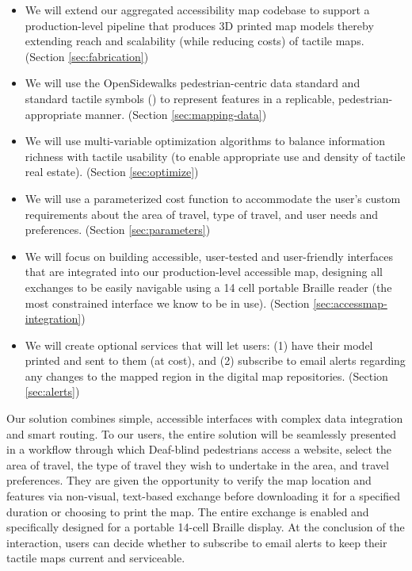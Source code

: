\begin{itemize}
    \item We will extend our aggregated accessibility map codebase to support a production-level pipeline that produces 3D printed map models thereby extending reach and scalability (while reducing costs) of tactile maps.  (Section \ref{sec:fabrication})
    \item We will use the OpenSidewalks pedestrian-centric data standard \cite{bolten2017} and standard tactile symbols (\cite{BANA}) to represent features in a replicable, pedestrian-appropriate manner.  (Section \ref{sec:mapping-data})
    \item We will use multi-variable optimization algorithms to balance information richness with tactile usability (to enable appropriate use and density of tactile real estate). (Section \ref{sec:optimize})
    \item We will use a parameterized cost function to accommodate the user’s custom requirements about the area of travel, type of travel, and user needs and preferences.  (Section \ref{sec:parameters})
    \item We will focus on building accessible, user-tested and user-friendly interfaces that are integrated into our production-level accessible map, designing all exchanges to be easily navigable using a 14 cell portable Braille reader (the most constrained interface we know to be in use). (Section \ref{sec:accessmap-integration})
    \item We will create optional services that will let users: (1) have their model printed and sent to them (at cost), and (2) subscribe to email alerts regarding any changes to the mapped region in the digital map repositories. (Section \ref{sec:alerts})
\end{itemize}

Our solution combines simple, accessible interfaces with complex data integration and smart routing. To our users, the entire solution will be seamlessly presented in a workflow through which Deaf-blind pedestrians access a website, select the area of travel, the type of travel they wish to undertake in the area, and travel preferences. They are given the opportunity to verify the map location and features via non-visual, text-based exchange before downloading it for a specified duration or choosing to print the map. The entire exchange is enabled and specifically designed for a portable 14-cell Braille display. At the conclusion of the interaction, users can decide whether to subscribe to email alerts to keep their tactile maps current and serviceable. 

